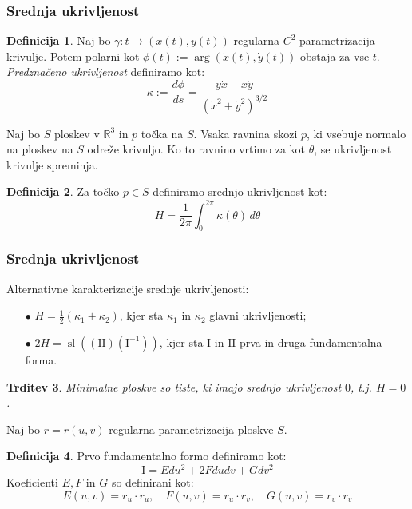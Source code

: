 \documentclass[10pt]{beamer}
\theoremstyle{definition}
\newtheorem{definicija}{Definicija}
\theoremstyle{remark}
\theoremstyle{plain}
\newtheorem{trditev}[definicija]{Trditev}
\numberwithin{equation}{section}  %
\begin{document}
\begin{frame}
    \frametitle{Srednja ukrivljenost}

    \begin{definicija}
        Naj bo $\gamma: t \mapsto(x(t), y(t))$ regularna $C^2$ parametrizacija krivulje. Potem polarni kot $\phi(t):=\arg (\dot{x}(t), \dot{y}(t))$ obstaja za vse $t$. \emph{Predznačeno ukrivljenost} definiramo kot: 
        $$
        \kappa:=\frac{d \phi}{d s}=\frac{\ddot{y} \dot{x}-\ddot{x} \dot{y}}{\left(\dot{x}^2+\dot{y}^2\right)^{3 / 2}}
        $$
    \end{definicija}

    Naj bo $S$ ploskev v $\mathbb{R}^3$ in $p$ točka na $S$. Vsaka ravnina skozi $p$, ki vsebuje normalo na ploskev na $S$ odreže krivuljo. Ko to ravnino vrtimo za kot $\theta$, se ukrivljenost krivulje spreminja. 

    \begin{definicija}
        Za točko $p \in S$ definiramo srednjo ukrivljenost kot: 
        $$
        H=\frac{1}{2 \pi} \int_0^{2 \pi} \kappa(\theta) \, d \theta
        $$
    \end{definicija}
\end{frame}

\begin{frame}
    \frametitle{Srednja ukrivljenost}

    Alternativne karakterizacije srednje ukrivljenosti:
    \begin{itemize}
        \item[$\bullet$] $H=\frac{1}{2}\left(\kappa_1+\kappa_2\right)$, kjer sta $\kappa_1$ in $\kappa_2$ glavni ukrivljenosti; 
        \item[$\bullet$] $2 H=\operatorname{sl}\left((\mathrm{II})\left(\mathrm{I}^{-1}\right)\right)$, kjer sta $\mathrm{I}$ in $\mathrm{II}$ prva in druga fundamentalna forma.
    \end{itemize}

    \begin{trditev}
        Minimalne ploskve so tiste, ki imajo srednjo ukrivljenost $0$, t.j. $H=0$. 
    \end{trditev}
    
    \vspace{1em}
    Naj bo $r=r(u, v)$ regularna parametrizacija ploskve $S$. 
   
    \begin{definicija}
        Prvo fundamentalno formo definiramo kot: 
        $$
        \mathrm{I}=E d u^2+2 F d u d v+G d v^2
        $$
        Koeficienti $E, F$ in $G$ so definirani kot: 
        $$
        E(u, v)=r_u \cdot r_u, \quad F(u, v)=r_u \cdot r_v, \quad G(u, v)=r_v \cdot r_v
        $$
    \end{definicija}
\end{frame}
\end{document}
